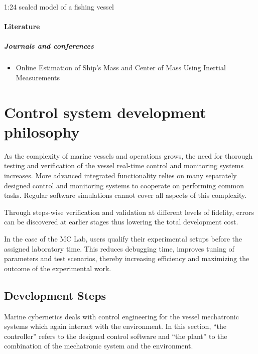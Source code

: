 \documentclass[a4paper,twoside,english]{report}
\begin{document}
1:24 scaled model of a fishing vessel

\subsubsection{Literature}

\paragraph{Journals and conferences}
\begin{itemize}
\item Online Estimation of Ship’s Mass and Center of Mass Using Inertial
Measurements \citep{LinderEnqvistFossenJohansenGustafsson2015}
\end{itemize}
\clearpage{}

\chapter{Control system development philosophy}

As the complexity of marine vessels and operations grows, the need
for thorough testing and verification of the vessel real-time control
and monitoring systems increases. More advanced integrated functionality
relies on many separately designed control and monitoring systems
to cooperate on performing common tasks. Regular software simulations
cannot cover all aspects of this complexity.

Through steps-wise verification and validation at different levels
of fidelity, errors can be discovered at earlier stages thus lowering
the total development cost.

In the case of the MC Lab, users qualify their experimental setups
before the assigned laboratory time. This reduces debugging time,
improves tuning of parameters and test scenarios, thereby increasing
efficiency and maximizing the outcome of the experimental work.

\clearpage{}

\section{Development Steps}

Marine cybernetics deals with control engineering for the vessel mechatronic
systems which again interact with the environment. In this section,
``the controller'' refers to the designed control software and ``the
plant'' to the combination of the mechatronic system and the environment.
\end{document}

